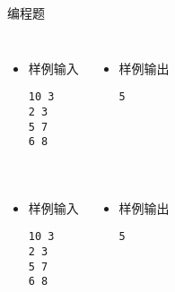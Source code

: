 \begin{frame}[fragile]
{\begin{exampleblock}{编程题}
{                \begin{columns}[onlytextwidth,T]
                    \begin{itemize}
                        \item 样例输入

                            \lstinline|10 3|\\
                            \lstinline|2 3|\\
                            \lstinline|5 7|\\
                            \lstinline|6 8|

                    \end{itemize}

                    \begin{itemize}
                        \item 样例输出

                            \lstinline|5|

                    \end{itemize}
                \end{columns}
            }{
                \begin{columns}[onlytextwidth,T]
                    \begin{itemize}
                        \item 样例输入

                            \lstinline|10 3|\\
                            \lstinline|2 3|\\
                            \lstinline|5 7|\\
                            \lstinline|6 8|\\
                            \lstinline||

                    \end{itemize}

                    \begin{itemize}
                        \item 样例输出

                            \lstinline|5|

                    \end{itemize}
                \end{columns}

}
\end{exampleblock}}
\end{frame}
